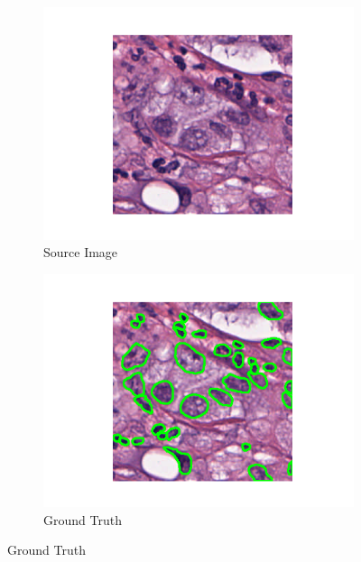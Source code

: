 \documentclass[target=bach,aauheader=,style=]{thud}
\begin{document}
\begin{figure}[!htbp]
\centering

\begin{subfigure}{0.48\textwidth}
  \centering
  \includegraphics[width=\linewidth]{imgs/qualitative/medium/RGB/img.png}
  \caption{Source Image}
\end{subfigure}\hfill
\begin{subfigure}{0.48\textwidth}
  \centering
  \includegraphics[width=\linewidth]{imgs/qualitative/medium/contour_img.png}
  \caption{Ground Truth}
\end{subfigure}


\end{figure}
\end{document}
